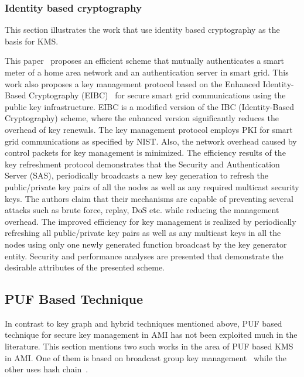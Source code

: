 \subsubsection{Identity based cryptography}
This section illustrates the work that use identity based cryptography as the basis for KMS.
\par This paper~\cite{Nicanfar14} proposes an efficient scheme that mutually authenticates a smart meter of a home area network and an authentication server in smart grid. This work also proposes a key management protocol based on the Enhanced Identity-Based Cryptography (EIBC)~\cite{Nicanfar12} for secure smart grid communications using the public key infrastructure. EIBC is a modified version of the IBC (Identity-Based Cryptography) scheme, where the enhanced version significantly reduces the overhead of key renewals. The key management protocol employs PKI for smart grid communications as specified by NIST. Also, the network overhead caused by control packets for key management is minimized. The efficiency results of the key refreshment protocol demonstrates that the Security and Authentication Server (SAS), periodically broadcasts a new key generation to refresh the public/private key pairs of all the nodes as well as any required multicast security keys. The authors claim that their mechanisms are capable of preventing several attacks such as brute force, replay, DoS etc. while reducing the management overhead. The improved efficiency for key management is realized by periodically refreshing all public/private key pairs as well as any multicast keys in all the nodes using only one newly generated function broadcast by the key generator entity. Security and performance analyses are presented that demonstrate the desirable attributes of the presented scheme.

\subsection{PUF Based Technique}
In contrast to key graph and hybrid techniques mentioned above, PUF based technique for secure key management in AMI has not been exploited much in the literature. This section mentions two such works in the area of PUF based KMS in AMI. One of them is based on broadcast group key management~\cite{Nabeel15} while the other uses hash chain~\cite{Delavar17}.

